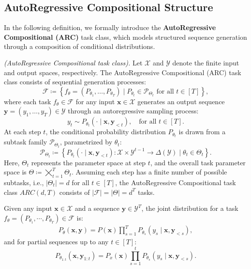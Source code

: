 \subsection{AutoRegressive Compositional Structure }\label{sec: ARC}



In the following definition, we formally introduce the \textbf{AutoRegressive Compositional (ARC)} task class, which models structured sequence generation through a composition of conditional distributions.

\begin{definition}\label{def:ar_composition}
\textit{(AutoRegressive Compositional task class).} Let $\mathcal{X}$ and $\mathcal{Y}$ denote the finite input and output spaces, respectively. The AutoRegressive Compositional (ARC) task class consists of sequential generation processes:
\[
\mathcal{F} \coloneqq \left\{ f_\theta = (P_{\theta_1}, \dots, P_{\theta_T}) \mid P_{\theta_t} \in \mathcal{P}_{\Theta_t} \text{ for all } t \in [T] \right\},
\]
where each task \( f_\theta \in \mathcal{F} \) for any input $\bm{x} \in \mathcal{X}$ generates an output sequence \( \bm{y} = (y_1, \dots, y_T)\in \mathcal{Y} \) through an autoregressive sampling process:
\[
y_t \sim P_{\theta_t}(\cdot \mid \bm{x}, \bm{y}_{<t}), \quad \text{for all } t \in [T].
\]
At each step \( t \), the conditional probability distribution \( P_{\theta_t} \) is drawn from a subtask family \( \mathcal{P}_{\Theta_t} \), parametrized by \( \theta_t \):
\[
\mathcal{P}_{\Theta_t} \coloneqq \left\{ P_{\theta_t}(\cdot \mid \bm{x}, \bm{y}_{<t}) : \mathcal{X} \times \mathcal{Y}^{t-1} \to \Delta(\mathcal{Y}) \mid \theta_t \in \Theta_t \right\}.
\]
Here, \( \Theta_t \) represents the parameter space at step \( t \), and the overall task parameter space is \( \Theta \coloneqq \bigtimes_{t=1}^T \Theta_t \). Assuming each step has a finite number of possible subtasks, i.e., \( |\Theta_t| = d \) for all \( t \in [T] \), the AutoRegressive Compositional task class \( ARC(d, T) \) consists of \( |\mathcal{F}| = |\Theta| = d^T \) tasks.
\end{definition}




Given any input $\bm{x} \in \mathcal{X}$ and a sequence $\bm{y} \in \mathcal{Y}^T$, the joint distribution for a task $f_\theta=(P_{\theta_1},\cdots,P_{\theta_T}) \in \mathcal{F}$ is:
\begin{align}\label{eq:joint dist}
P_\theta(\bm{x}, \bm{y}) = P(\bm{x}) \prod_{s=1}^T P_{\theta_s}(y_s \mid \bm{x}, \bm y_{<s}), 
\end{align}
and for partial sequences up to any $t \in [T]$:
\begin{equation}
P_{\theta_{1:t}}(\bm{x}, \bm y_{1:t}) = P_x(\bm{x}) \prod_{s=1}^t P_{\theta_s}(y_s \mid \bm{x}, \bm y_{<s}).
\end{equation}


